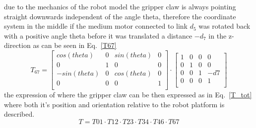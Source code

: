 due to the mechanics of the robot model the gripper claw is always pointing straight downwards independent of the angle theta, therefore the coordinate system in the middle if the medium motor connected to link \(d_5\) was rotated back with a positive angle theta before it was translated a distance \(-d_7\) in the z-direction as can be seen in Eq.~\eqref{T67}
\begin{equation}
    T_{67} =
    \begin{bmatrix}
    cos(theta)&0&sin(theta)&0\\
    0&1&0&0\\
    -sin(theta)&0&cos(theta)&0\\
    0&0&0&1\\
    \end{bmatrix}
    \cdot
     \begin{bmatrix}
    1&0&0&0\\
    0&1&0&0\\
    0&0&1&-d7\\
    0&0&0&1\\
    \end{bmatrix}
    \label{T67}
\end{equation}
the expression of where the gripper claw can be then expressed as in Eq.~\eqref{T_tot} where both it's position and orientation relative to the robot platform is described.
\begin{equation}
    T = T01\cdot T12\cdot T23 \cdot T34 \cdot T46 \cdot T67
    \label{T_tot}
\end{equation}

